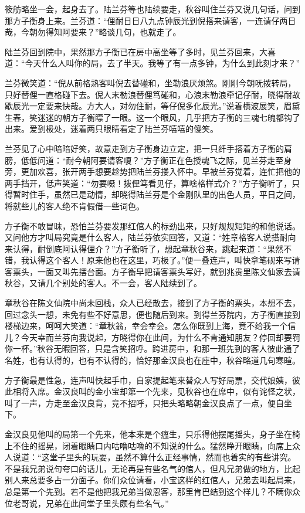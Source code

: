 \documentclass[12pt,UTF8]{ctexbook}
\begin{document}
{{{筱舫略坐一会，起身去了。陆兰芬等也陆续要走，秋谷叫住兰芬又说几句话，问到那方子衡身上来。兰芬道：“俚耐日日八九点钟辰光到倪搭来请客，一连请仔两日哉，今朝勿得知阿要来？”略谈几句，也就走了。

陆兰芬回到院中，果然那方子衡已在房中高坐等了多时，见兰芬回来，大喜道：“今天什么人叫你的局，去了半天。我等了有一点多钟，为什么到此刻才来？”

兰芬微笑道：“倪从前格熟客叫倪去替碰和，坐勒浪厌烦煞。刚刚今朝呒拨转局，只好替俚一直格碰下去。倪人末勒浪替俚笃碰和，心浪末勒浪牵记仔耐，晓得耐故歇辰光一定要来快哉。方大人，对勿住耐，等仔倪多化辰光。”说着横波展笑，眉黛生春，笑迷迷的朝方子衡瞟了一眼。这一个眼风，几乎把方子衡的三魂七魄都钩了出来。爱到极处，迷着两只眼睛看定了陆兰芬嘻嘻的傻笑。

兰芬见了心中暗暗好笑，故意走到方子衡身边立定，把一只纤手搭着方子衡的肩膀，低低问道：“耐今朝阿要请客嗄？”方子衡正在色授魂飞之际，见兰芬走至身旁，更加欢喜，张开两手想要趁势把陆兰芬搂入怀中。早被兰芬觉着，连忙把他的两手挡开，低声笑道：“勿要嗫！拨俚笃看见仔，算啥格样式介？”方子衡听了，只得暂时住手，虽然已是动情，却晓得陆兰芬是个金刚队里的出色人员，平日之间，将就些儿的客人绝不肯假借一些词色。

方子衡不敢冒昧，恐怕兰芬要发那红倌人的标劲出来，只好规规矩矩的和他说话。又问他方才叫局究竟是什么客人，陆兰芬依实回答，又道：“姓章格客人说搭耐向来认得，耐倒底阿认得俚介？”方子衡听了，想起章秋谷来，跳起来道：“果然不错，我认得这个客人！原来他也在这里，巧极了。”便一叠连声，叫快拿笔砚来写请客票头，一面又叫先摆台面。方子衡早把请客票头写好，就到兆贵里陈文仙家去请秋谷，又请几个别处的客人。不一会，客人陆续到了。

章秋谷在陈文仙院中尚未回栈，众人已经散去，接到了方子衡的票头，本想不去，回过念头一想，未免有些不好意思，便也随后到来。到得兰芬院内，方子衡直接到楼梯边来，呵呵大笑道：“章秋翁，幸会幸会。怎么你既到上海，竟不给我一个信儿？今天幸而兰芬向我说起，方晓得你在此间，为什么不肯通知朋友？停回却要罚你一杯。”秋谷无暇回答，只是含笑招呼。跨进房中，和那一班先到的客人彼此通了名姓，也有认得的，也有不认得的，恰好那金汉良也在座中，秋谷略道几句寒暄。

方子衡最是性急，连声叫快起手巾，自家提起笔来替众人写好局票，交代娘姨，彼此相将入席。金汉良叫的金小宝却第一个先来，见秋谷也在席中，似有诧怪之状，叫了一声，方走至金汉良背，竞不招呼，只把头略略朝金汉良点了一点，便自坐下。

金汉良见他叫的局第一个先来，他本来是个瘟生，只乐得他摆尾摇头，身子坐在椅上不住的摇晃，闭着眼睛口内咕噜咕噜的不知说的什么。猛然睁开眼睛，向席上众人说道：“这堂子里头的玩耍，虽然不算什么正经事情，然而也着实的有些讲究。不是我兄弟说句夸口的话儿，无论再是有些名气的倌人，但凡兄弟做的地方，比起别人来总要多占一分面子。你们众位请看，小宝这样的红倌人，兄弟去叫起局来，总是第一个先到。若不是他把我兄弟当做恩客，那里肯巴结到这个样儿？不瞒你众位老哥说，兄弟在此间堂子里头颇有些名气。”

}}}
\end{document}
